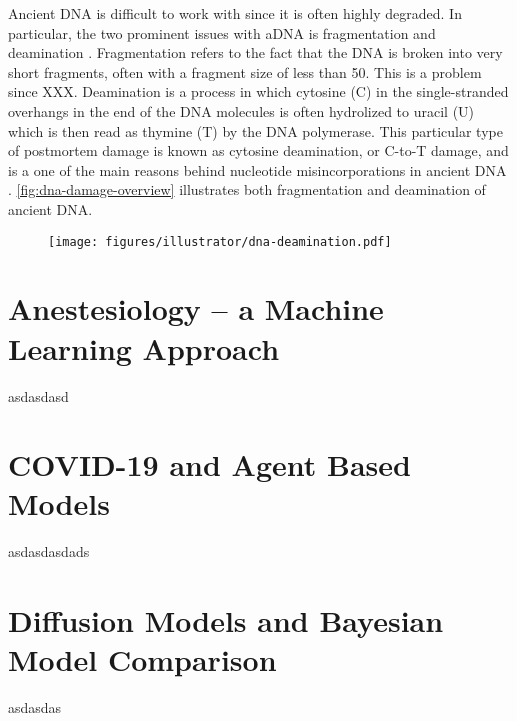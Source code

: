 Ancient DNA is difficult to work with since it is often highly degraded. In particular, the two prominent issues with aDNA is fragmentation and deamination \autocite{dabneyAncientDNADamage2013a,peyregnePresentDayDNAContamination2020,renaudAuthenticationAssessmentContamination2019}. Fragmentation refers to the fact that the DNA is broken into very short fragments, often with a fragment size of less than \SI{50}{\basepairs}. This is a problem since XXX.
Deamination is a process in which cytosine (C) in the single-stranded overhangs in the end of the DNA molecules is often hydrolized to uracil (U) which is then read as thymine (T) by the DNA polymerase. This particular type of postmortem damage is known as cytosine deamination, or C-to-T damage, and is a one of the main reasons behind nucleotide misincorporations in ancient DNA \autocite{briggsPatternsDamageGenomic2007}. \autoref{fig:dna-damage-overview} illustrates both fragmentation and deamination of ancient DNA.

\begin{figure}[htbp]
    \texttt{[image: figures/illustrator/dna-deamination.pdf]}
\end{figure}



\section{Anestesiology -- a Machine Learning Approach }
\label{section:machine-learning}

asdasdasd


\section{COVID-19 and Agent Based Models}
\label{section:agent-based-models}
asdasdasdads

\section{Diffusion Models and Bayesian Model Comparison}
\label{section:diffusion}
asdasdas

